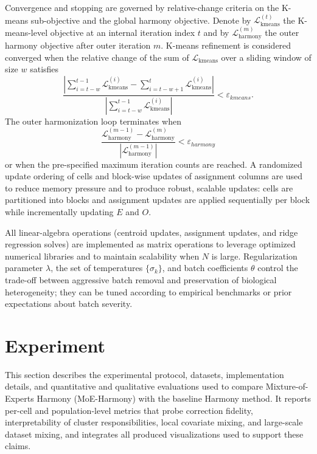 \documentclass{article}
\begin{document}
Convergence and stopping are governed by relative-change criteria on the K-means sub-objective and the global harmony objective. Denote by $\mathcal{L}_{\mathrm{kmeans}}^{(t)}$ the K-means-level objective at an internal iteration index $t$ and by $\mathcal{L}_{\mathrm{harmony}}^{(m)}$ the outer harmony objective after outer iteration $m$. K-means refinement is considered converged when the relative change of the sum of $\mathcal{L}_{\mathrm{kmeans}}$ over a sliding window of size $w$ satisfies
\begin{equation}
    \frac{\left| \sum_{i=t-w}^{t-1} \mathcal{L}_{\mathrm{kmeans}}^{(i)} - \sum_{i=t-w+1}^{t} \mathcal{L}_{\mathrm{kmeans}}^{(i)} \right|}{\left| \sum_{i=t-w}^{t-1} \mathcal{L}_{\mathrm{kmeans}}^{(i)} \right|} < \varepsilon_{kmeans}.
\end{equation}
The outer harmonization loop terminates when
\begin{equation}
    \frac{\mathcal{L}_{\mathrm{harmony}}^{(m-1)} - \mathcal{L}_{\mathrm{harmony}}^{(m)}}{\left| \mathcal{L}_{\mathrm{harmony}}^{(m-1)} \right|} < \varepsilon_{harmony}
\end{equation}
or when the pre-specified maximum iteration counts are reached. A randomized update ordering of cells and block-wise updates of assignment columns are used to reduce memory pressure and to produce robust, scalable updates: cells are partitioned into blocks and assignment updates are applied sequentially per block while incrementally updating $E$ and $O$.

All linear-algebra operations (centroid updates, assignment updates, and ridge regression solves) are implemented as matrix operations to leverage optimized numerical libraries and to maintain scalability when $N$ is large. Regularization parameter $\lambda$, the set of temperatures $\{\sigma_k\}$, and batch coefficients $\theta$ control the trade-off between aggressive batch removal and preservation of biological heterogeneity; they can be tuned according to empirical benchmarks or prior expectations about batch severity.

\section{Experiment}

This section describes the experimental protocol, datasets, implementation details, and quantitative and qualitative evaluations used to compare Mixture-of-Experts Harmony (MoE-Harmony) with the baseline Harmony method. It reports per-cell and population-level metrics that probe correction fidelity, interpretability of cluster responsibilities, local covariate mixing, and large-scale dataset mixing, and integrates all produced visualizations used to support these claims.
\end{document}
